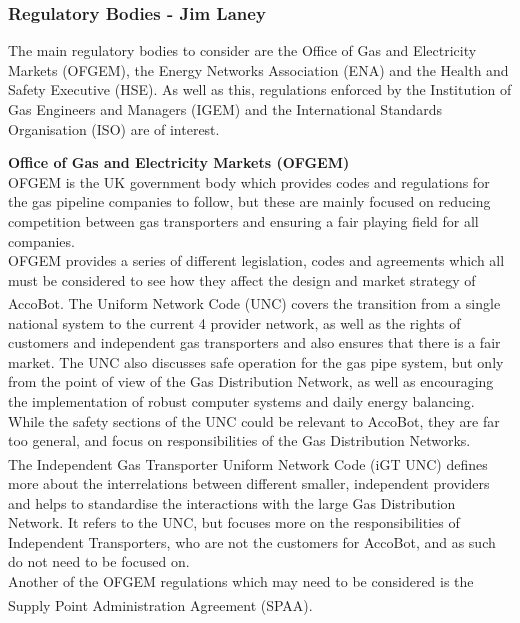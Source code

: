 \documentclass[11pt]{article}		%
\newcommand{\supercite}[1]{\textsuperscript{\cite{#1}}}		%
\begin{document}
		\subsubsection[Regulatory Bodies]{Regulatory Bodies - Jim Laney} 
		\label{govermentreg}
			
			The main regulatory bodies to consider are the Office of Gas and Electricity Markets (OFGEM), the Energy Networks Association (ENA) and the Health and Safety Executive (HSE).
			As well as this, regulations enforced by the Institution of Gas Engineers and Managers (IGEM) and the International Standards Organisation (ISO) are of interest.
 			
 			\textbf{Office of Gas and Electricity Markets (OFGEM)}
 			\\
			OFGEM is the UK government body which provides codes and regulations for the gas pipeline companies to follow, but these are mainly focused on reducing competition between gas transporters and ensuring a fair playing field for all companies.
		    \\
		    \hspace*{2ex}OFGEM provides a series of different legislation, codes and agreements which all must be considered to see how they affect the design and market strategy of AccoBot.
			The Uniform Network Code (UNC)\supercite{joint2005uniform} covers the transition from a single national system to the current 4 provider network, as well as the rights of customers and independent gas transporters and also ensures that there is a fair market.
			The UNC also discusses safe operation for the gas pipe system, but only from the point of view of the Gas Distribution Network, as well as encouraging the implementation of robust computer systems and daily energy balancing.
			While the safety sections of the UNC could be relevant to AccoBot, they are far too general, and focus on responsibilities of the Gas Distribution Networks.
		    \\
            \hspace*{2ex}The Independent Gas Transporter Uniform Network Code (iGT UNC)\supercite{igt2021independent} defines more about the interrelations between different smaller, independent providers and helps to standardise the interactions with the large Gas Distribution Network.
			It refers to the UNC, but focuses more on the responsibilities of Independent Transporters, who are not the customers for AccoBot, and as such do not need to be focused on.
			\\
            \hspace*{2ex}Another of the OFGEM regulations which may need to be considered is the Supply Point Administration Agreement (SPAA)\supercite{spaa2021supply}. 
\end{document}
